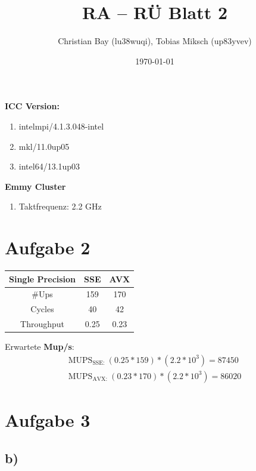 \documentclass{article}
\title{RA -- R\"U Blatt 2}
\author{Christian Bay (lu38wuqi), Tobias Miksch (up83yvev)}
\date{\today}
\begin{document}
\maketitle

\textbf{ICC Version:}
\begin{enumerate}
	\item intelmpi/4.1.3.048-intel
	\item mkl/11.0up05
	\item intel64/13.1up03
\end{enumerate}

\textbf{Emmy Cluster}
\begin{enumerate}
	\item Taktfrequenz: 2.2 GHz
\end{enumerate}

\vspace*{6pt}

\section*{Aufgabe 2}
\begin{tabular}{ c | c | c |}
Single Precision &	SSE			& AVX \\
	\hline
	\#Ups & 159 & 170\\
	\hline
	Cycles & 40 & 42\\
	\hline
	Throughput & 0.25 & 0.23 \\
	\hline
\end{tabular}



\vspace*{10pt}
Erwartete \textbf{Mup/s}:\\
\begin{align*}
	\text{MUPS}_{\text{SSE: }} (0.25*159) * (2.2 * 10^3) = 87450\\
	\text{MUPS}_{\text{AVX: }} (0.23*170) * (2.2 * 10^3) = 86020
\end{align*}
\section*{Aufgabe 3}
\subsection*{b)}
\end{document}
